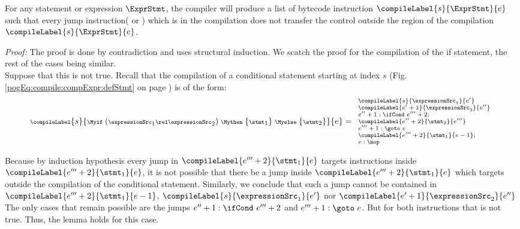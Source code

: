 \begin{compPropApp}\label{compile:prop:compProp1}

    For any statement or expression $\ExprStmt $,  
    the compiler will produce a list of bytecode instruction $\compileLabel{s}{\ExprStmt}{e}$ such that every jump instruction(\goto {} or \ifCond) which is in the compilation 
    does not transfer the control outside the region of the compilation  $\compileLabel{s}{\ExprStmt}{e}$.

\end{compPropApp}
\textit{Proof:} 
The proof is done by contradiction and uses structural induction. 
We scatch the proof for the compilation of the if statement, the rest of the cases being similar. \\
Suppose that this is not true.
Recall that the compilation of a conditional statement starting at index $s$  
(Fig. \ref{pogEq:compile:compExpr:defStmt} on page \pageref{pogEq:compile:compExpr:defStmt}) is of the form:
$${\scriptsize \compileLabel{s}{ \Myif \ ( \expressionSrc_1 \rel \expressionSrc_2 ) \ \Mythen \ \{ \stmt_1 \}  \  \Myelse \ \{ \stmt_2 \}   }{e}= 
\begin{array}{l}
\compileLabel{s}{\expressionSrc_1}{e'} \\
\compileLabel{e'+1}{\expressionSrc_2}{e''}\\ 
 e'' + 1: \ifCond \ e''' + 2; \\
 \compileLabel{e'' + 2}{\stmt_2}{e'''}\\
 e''' + 1: \goto \ e\\  
\compileLabel{e''' +  2}{\stmt_1}{ e -1 };\\
 e : \nop
\end{array}}
		    $$
 
Because by induction hypothesis every jump in  $\compileLabel{e''' +  2}{\stmt_1}{ e} $ targets  instructions inside $\compileLabel{e''' +  2}{\stmt_1}{ e} $,
 it  is not possible that there be  a jump  inside 
$\compileLabel{e''' +  2}{\stmt_1}{ e} $  which targets outside the compilation of the conditional statement.
 Similarly, we conclude that such a  jump cannot be contained in 
$\compileLabel{e''' +  2}{\stmt_1}{ e -1  } $, $ \compileLabel{s}{\expressionSrc_1}{e'}$ nor $\compileLabel{e'+1}{\expressionSrc_2}{e''}$
The only cases that remain possible are the  jumps  $ e'' + 1: \ifCond \ e''' + 2 $  and $ e''' + 1: \goto \ e  $.
 But for both instructions that is not true. Thus, the lemma holds for this case.

